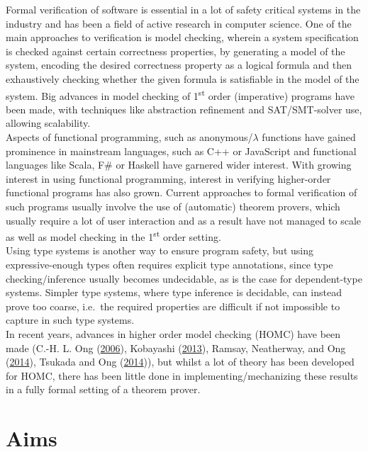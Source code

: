 \documentclass[a4paper, 12pt, twoside]{style/ociamthesis}
\theoremstyle{plain}
\theoremstyle{definition}
\theoremstyle{remark}
\begin{document}
Formal verification of software is essential in a lot of safety critical
systems in the industry and has been a field of active research in
computer science. One of the main approaches to verification is model
checking, wherein a system specification is checked against certain
correctness properties, by generating a model of the system, encoding
the desired correctness property as a logical formula and then
exhaustively checking whether the given formula is satisfiable in the
model of the system. Big advances in model checking of
1\textsuperscript{st} order (imperative) programs have been made, with
techniques like abstraction refinement and SAT/SMT-solver use, allowing
scalability.\\
Aspects of functional programming, such as anonymous/\(\lambda\)
functions have gained prominence in mainstream languages, such as C++ or
JavaScript and functional languages like Scala, F\# or Haskell have
garnered wider interest. With growing interest in using functional
programming, interest in verifying higher-order functional programs has
also grown. Current approaches to formal verification of such programs
usually involve the use of (automatic) theorem provers, which usually
require a lot of user interaction and as a result have not managed to
scale as well as model checking in the 1\textsuperscript{st} order
setting.\\
Using type systems is another way to ensure program safety, but using
expressive-enough types often requires explicit type annotations, since
type checking/inference usually becomes undecidable, as is the case for
dependent-type systems. Simpler type systems, where type inference is
decidable, can instead prove too coarse, i.e.~the required properties
are difficult if not impossible to capture in such type systems.\\
In recent years, advances in higher order model checking (HOMC) have
been made (C.-H. L. Ong (\protect\hyperlink{ref-ong06}{2006}), Kobayashi
(\protect\hyperlink{ref-kobayashi13}{2013}), Ramsay, Neatherway, and Ong
(\protect\hyperlink{ref-ramsay14}{2014}), Tsukada and Ong
(\protect\hyperlink{ref-tsukada14}{2014})), but whilst a lot of theory
has been developed for HOMC, there has been little done in
implementing/mechanizing these results in a fully formal setting of a
theorem prover.

\section{Aims}\label{aims}
\end{document}
